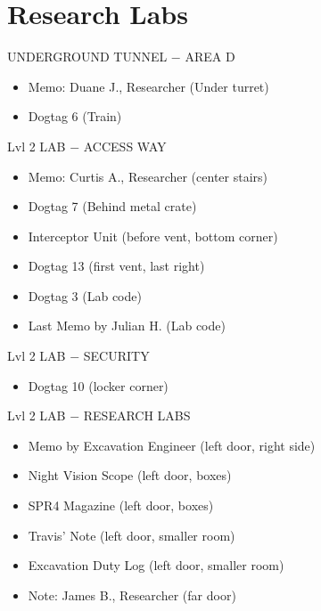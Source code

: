 \chapter{Research Labs}

\begin{subregion}{UNDERGROUND TUNNEL $\boldsymbol{-}$ AREA D}
    \begin{itemize}
        \item Memo: Duane J., Researcher (Under turret)
        \item Dogtag 6 (Train)
    \end{itemize}
\end{subregion}

\begin{subregion}{Lvl 2 LAB $\boldsymbol{-}$ ACCESS WAY}
    \begin{itemize}
        \item Memo: Curtis A., Researcher (center stairs)
        \item Dogtag 7 (Behind metal crate)
        \item Interceptor Unit (before vent, bottom corner)
        \item Dogtag 13 (first vent, last right)
        \item Dogtag 3 (Lab code)
        \item Last Memo by Julian H. (Lab code)
    \end{itemize}
\end{subregion}

\begin{subregion}{Lvl 2 LAB $\boldsymbol{-}$ SECURITY}
    \begin{itemize}
        \item Dogtag 10 (locker corner)
    \end{itemize}
\end{subregion}

\begin{subregion}{Lvl 2 LAB  $\boldsymbol{-}$ RESEARCH LABS}
    \begin{itemize}
        \item Memo by Excavation Engineer (left door, right side)
        \item Night Vision Scope (left door, boxes)
        \item SPR4 Magazine (left door, boxes)
        \item Travis' Note (left door, smaller room)
        \item Excavation Duty Log (left door, smaller room)
        \item Note: James B., Researcher (far door)
    \end{itemize}
\end{subregion}

